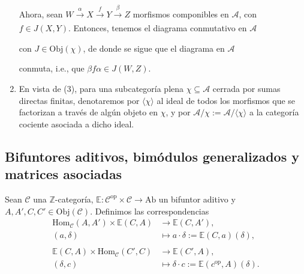 \documentclass[tesis]{subfiles}
\begin{document}
\begin{Obs}
\begin{enumerate}[label=(\arabic*)]
                Ahora, sean $W\xrightarrow[]{\alpha}X\xrightarrow[]{f}Y\xrightarrow[]{\beta}Z$ morfismos componibles en $\mathscr{A}$, con $f\in J(X,Y)$. Entonces, tenemos el diagrama conmutativo en $\mathscr{A}$
                \begin{center}
                \end{center}
                con $J\in\text{Obj}(\chi)$, de donde se sigue que el diagrama en $\mathscr{A}$
                \begin{center}
                \end{center}
                conmuta, i.e., que $\beta f\alpha\in J(W,Z)$.

            \item En vista de (3), para una subcategoría plena $\chi\subseteq\mathscr{A}$ cerrada por sumas directas finitas, denotaremos por $\langle\chi\rangle$ al ideal de todos los morfismos que se factorizan a través de algún objeto en $\chi$, y por $\mathscr{A}/\chi := \mathscr{A}/\langle\chi\rangle$ a la categoría cociente asociada a dicho ideal.
    \end{enumerate}
\end{Obs}

\subsection*{Bifuntores aditivos, bimódulos generalizados y matrices asociadas} \label{Ssec: Bifuntores aditivos, bimódulos generalizados y matrices asociadas}

\begin{Def}
    Sean $\mathscr{C}$ una $\mathbb{Z}$-categoría, $\mathbb{E}:\mathscr{C}^\text{op}\times\mathscr{C}\to \text{Ab}$ un bifuntor aditivo y $A,A',C,C'\in\text{Obj}(\mathscr{C})$. Definimos las correspondencias
    \begin{align*}
        \text{Hom}_\mathscr{C}(A,A')\times\mathbb{E}(C,A) &\to \mathbb{E}(C,A'), \\
        (a,\delta) &\mapsto a\cdot\delta:=\mathbb{E}(C,a)(\delta), \\ \\
        \mathbb{E}(C,A)\times\text{Hom}_\mathscr{C}(C',C) &\to \mathbb{E}(C',A), \\
        (\delta,c) &\mapsto \delta\cdot c:=\mathbb{E}(c^\text{op},A)(\delta).
    \end{align*}
\end{Def}
\end{document}
